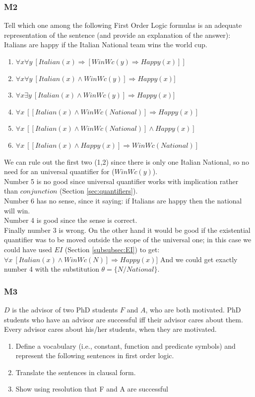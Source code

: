 \documentclass[10pt,a4paper]{article}
\begin{document}
\subsubsection{M2}
Tell which one among the following First Order Logic formulas is an adequate representation of the sentence (and provide an explanation of the answer):
Italians are happy if the Italian National team wins the world cup.
\begin{enumerate}
\item $\forall x\forall y\ [Italian(x)\Rightarrow [WinWc(y)\Rightarrow Happy(x)]]$
\item $\forall x\forall y\ [Italian(x)\wedge WinWc(y)]\Rightarrow Happy(x)]$
\item $\forall x\exists y\ [Italian(x)\wedge WinWc(y)]\Rightarrow Happy(x)]$
\item $\forall x\ [[Italian(x)\wedge WinWc(National)]\Rightarrow Happy(x)]$
\item $\forall x\ [[Italian(x)\wedge WinWc(National)]\wedge Happy(x)]$
\item $\forall x\ [[Italian(x)\wedge Happy(x)]\Rightarrow  WinWc(National)]$
\end{enumerate}

We can rule out the first two (1,2) since there is only one Italian National, so no need for an universal quantifier for ($WinWc(y)$).\\
Number 5 is no good since universal quantifier works with implication rather than $conjunction$ (Section \ref{sec:quantifiers}).\\
Number 6 has no sense, since it saying: if Italians are happy then the national will win.\\
Number 4 is good since the sense is correct.\\
Finally number 3 is wrong. On the other hand it would be good  if the existential quantifier was to be moved outside the scope of the universal one; in this case we could have used $EI$ (Section \ref{subsubsec:EI}) to get:
$\forall x\ [Italian(x)\wedge WinWc(N)]\Rightarrow Happy(x)]$
And we could get exactly number 4 with the substitution $\theta=\{N/National\}$.

\subsubsection{M3}
$D$ is the advisor of two PhD students $F$ and $A$, who are both motivated. PhD students who have an advisor are successful iff their advisor cares about them. Every advisor cares about his/her students, when they are motivated.
\begin{enumerate}
\item Define a vocabulary (i.e., constant, function and predicate symbols) and represent the following sentences in first order logic.
\item Translate the sentences in clausal form.
\item Show using resolution that F and A are successful
\end{enumerate}
\end{document}
